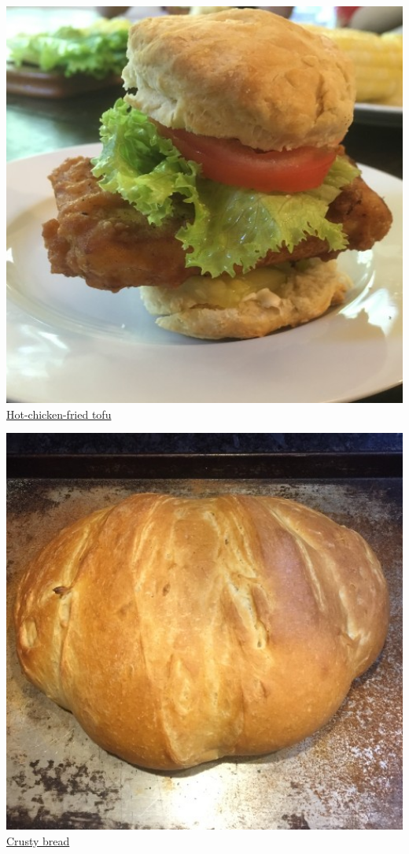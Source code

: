 \documentclass[
]{book}
\begin{document}
\protect\hyperlink{hottofu}{\includegraphics[width=1\textwidth,height=\textheight]{hot_chicken_tofu_small.jpg}}
\protect\hyperlink{hottofu}{Hot-chicken-fried tofu}

\protect\hyperlink{crustybread}{\includegraphics[width=1\textwidth,height=\textheight]{crusty_bread_small.jpg}}
\protect\hyperlink{crustybread}{Crusty bread}
\end{document}
